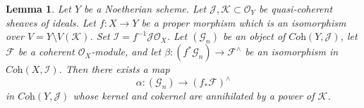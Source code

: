 \documentclass[10pt,a4paper]{amsart}
\theoremstyle{plain}
\newtheorem{lemma}[subsection]{Lemma}
\theoremstyle{definition}
\theoremstyle{remark}
\numberwithin{equation}{subsection}
\begin{document}
\begin{lemma}
\label{lemma-inverse-systems-push-pull}
Let $Y$ be a Noetherian scheme. Let
$\mathcal{J}, \mathcal{K} \subset \mathcal{O}_Y$
be quasi-coherent sheaves of ideals.
Let $f : X \to Y$ be a proper morphism which is an isomorphism
over $V = Y \setminus V(\mathcal{K})$.
Set $\mathcal{I} = f^{-1}\mathcal{J} \mathcal{O}_X$.
Let $(\mathcal{G}_n)$ be an object of $\textit{Coh}(Y, \mathcal{J})$,
let $\mathcal{F}$ be a coherent $\mathcal{O}_X$-module, and let
$\beta : (f^*\mathcal{G}_n)  \to \mathcal{F}^\wedge$ be an isomorphism in
$\textit{Coh}(X, \mathcal{I})$. Then there exists a map
$$
\alpha :
(\mathcal{G}_n)
\longrightarrow
(f_*\mathcal{F})^\wedge
$$
in $\textit{Coh}(Y, \mathcal{J})$ whose kernel and cokernel
are annihilated by a power of $\mathcal{K}$.
\end{lemma}
\end{document}
